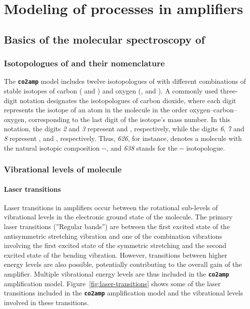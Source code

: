 \chapter{Modeling of processes in \texorpdfstring{}{CO2} amplifiers}\label{chapter:models}


\section{Basics of the molecular spectroscopy of }

\subsection{Isotopologues of  and their nomenclature}

The \textbf{\texttt{co2amp}} model includes twelve isotopologues of  with different combinations of stable isotopes of carbon ( and ) and oxygen (,  and ). A commonly used three-digit notation designates the isotopologues of carbon dioxide, where each digit represents the isotope of an atom in the molecule in the order oxygen–carbon–oxygen, corresponding to the last digit of the isotope's mass number. In this notation, the digits \textit{2} and \textit{3} represent  and , respectively, while the digits \textit{6}, \textit{7} and \textit{8} represent ,  and , respectively. Thus, \textit{626}, for instance, denotes a  molecule with the natural isotopic composition --, and \textit{638} stands for the -- isotopologue.




\subsection{Vibrational levels of  molecule}

\subsubsection{Laser transitions}

Laser transitions in  amplifiers occur between the rotational sub-levels of vibrational levels in the electronic ground state of the molecule. The primary laser transitions (''Regular bands'') are between the first excited state of the antisymmetric stretching vibration and one of the combination vibrations involving the first excited state of the symmetric stretching and the second excited state of the bending vibration. However, transitions between higher energy levels are also possible, potentially contributing to the overall gain of the amplifier. Multiple vibrational energy levels are thus included in the \textbf{\texttt{co2amp}} amplification model. Figure~\ref{fig:laser-transitions} shows some of the laser transitions included in the \textbf{\texttt{co2amp}} amplification model and the vibrational levels involved in these transitions.


